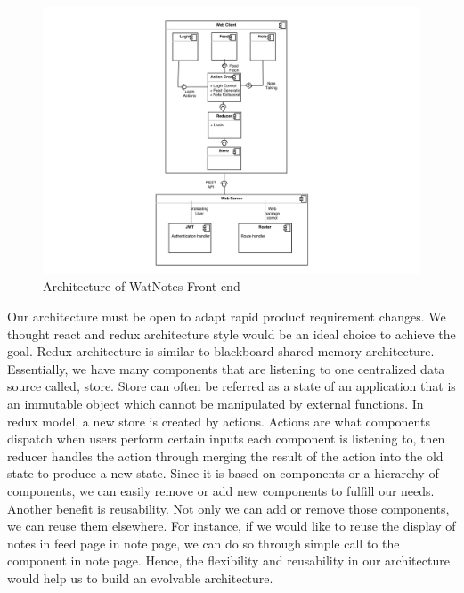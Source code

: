 \documentclass[12pt]{article}
\begin{document}
  \begin{figure}[H]
    \includegraphics[width=\textwidth]{assets/frontend_architecture.png}
    \caption{Architecture of WatNotes Front-end}
  \end{figure}

  Our architecture must be open to adapt rapid product requirement changes. We thought react and redux architecture style would be an ideal choice to achieve the goal. Redux architecture is similar to blackboard shared memory architecture. Essentially, we have many components that are listening to one centralized data source called, store. Store can often be referred as a state of an application that is an immutable object which cannot be manipulated by external functions. In redux model, a new store is created by actions. Actions are what components dispatch when users perform certain inputs each component is listening to, then reducer handles the action through merging the result of the action into the old state to produce a new state. Since it is based on components or a hierarchy of components, we can easily remove or add new components to fulfill our needs. Another benefit is reusability. Not only we can add or remove those components, we can reuse them elsewhere. For instance, if we would like to reuse the display of notes in feed page in note page, we can do so through simple call to the component in note page. Hence, the flexibility and reusability in our architecture would help us to build an evolvable architecture. \\
\end{document}

